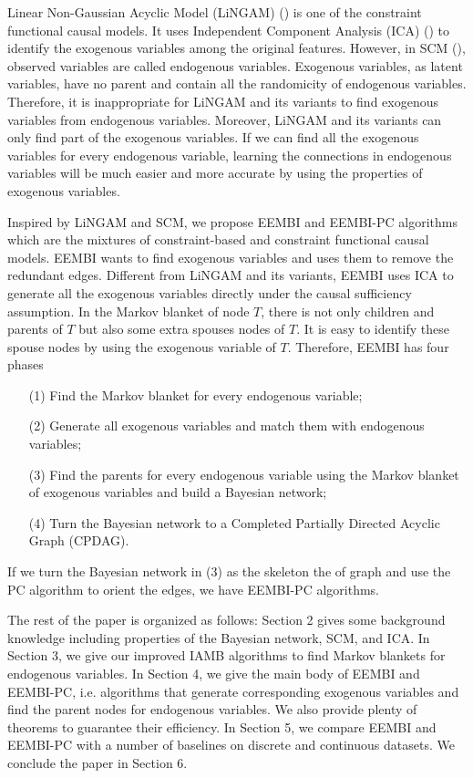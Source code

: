 \documentclass[twoside,11pt]{article}
\begin{document}
Linear Non-Gaussian Acyclic Model (LiNGAM) (\cite{shimizu2006linear}) is one of the constraint functional causal models. It uses Independent Component Analysis (ICA) (\cite{hyvarinen2000independent}) to identify the exogenous variables among the original features. However, in SCM (\cite{bollen1989structural}), observed variables are called endogenous variables. Exogenous variables, as latent variables, have no parent and contain all the randomicity of endogenous variables. Therefore, it is inappropriate for LiNGAM and its variants to find exogenous variables from endogenous variables. Moreover, LiNGAM and its variants can only find part of the exogenous variables. If we can find all the exogenous variables for every endogenous variable, learning the connections in endogenous variables will be much easier and more accurate by using the properties of exogenous variables.

Inspired by LiNGAM and SCM, we propose EEMBI and EEMBI-PC algorithms which are the mixtures of constraint-based and constraint functional causal models. EEMBI wants to find exogenous variables and uses them to remove the redundant edges. Different from LiNGAM and its variants, EEMBI uses ICA to generate all the exogenous variables directly under the causal sufficiency assumption. In the Markov blanket of node $T$, there is not only children and parents of $T$ but also some extra spouses nodes of $T$. It is easy to identify these spouse nodes by using the exogenous variable of $T$. Therefore, EEMBI has four phases
\begin{itemize}
    \item [(1)] Find the Markov blanket for every endogenous variable;
    \item [(2)] Generate all exogenous variables and match them with endogenous variables;
    \item [(3)] Find the parents for every endogenous variable using the Markov blanket of exogenous variables and build a Bayesian network;
    \item [(4)] Turn the Bayesian network to a Completed Partially Directed Acyclic Graph (CPDAG).
\end{itemize}
If we turn the Bayesian network in (3) as the skeleton the of graph and use the PC algorithm to orient the edges, we have EEMBI-PC algorithms.

The rest of the paper is organized as follows: Section 2 gives some background knowledge including properties of the Bayesian network, SCM, and ICA. In Section 3, we give our improved IAMB algorithms to find Markov blankets for endogenous variables. In Section 4, we give the main body of EEMBI and EEMBI-PC, i.e. algorithms that generate corresponding exogenous variables and find the parent nodes for endogenous variables. We also provide plenty of theorems to guarantee their efficiency. In Section 5, we compare EEMBI and EEMBI-PC with a number of baselines on discrete and continuous datasets. We conclude the paper in Section 6. 
\end{document}
